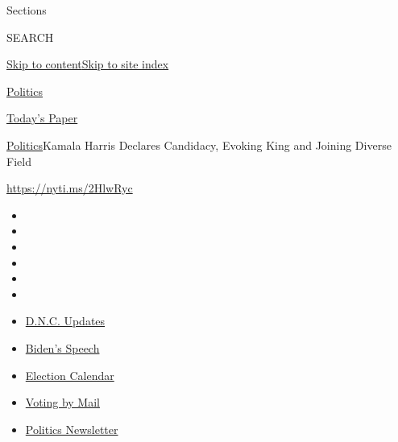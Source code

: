 Sections

SEARCH

\protect\hyperlink{site-content}{Skip to
content}\protect\hyperlink{site-index}{Skip to site index}

\href{https://www.nytimes3xbfgragh.onion/section/politics}{Politics}

\href{https://myaccount.nytimes3xbfgragh.onion/auth/login?response_type=cookie\&client_id=vi}{}

\href{https://www.nytimes3xbfgragh.onion/section/todayspaper}{Today's
Paper}

\href{/section/politics}{Politics}\textbar{}Kamala Harris Declares
Candidacy, Evoking King and Joining Diverse Field

\url{https://nyti.ms/2HlwRyc}

\begin{itemize}
\item
\item
\item
\item
\item
\item
\end{itemize}

\begin{itemize}
\item
  \href{https://www.nytimes3xbfgragh.onion/live/2020/08/20/us/dnc-convention-election?action=click\&pgtype=Article\&state=default\&region=TOP_BANNER\&context=storylines_menu}{D.N.C.
  Updates}
\item
  \href{https://www.nytimes3xbfgragh.onion/2020/08/20/us/politics/biden-presidential-nomination-dnc.html?action=click\&pgtype=Article\&state=default\&region=TOP_BANNER\&context=storylines_menu}{Biden's
  Speech}
\item
  \href{https://www.nytimes3xbfgragh.onion/interactive/2019/us/elections/2020-presidential-election-calendar.html?action=click\&pgtype=Article\&state=default\&region=TOP_BANNER\&context=storylines_menu}{Election
  Calendar}
\item
  \href{https://www.nytimes3xbfgragh.onion/interactive/2020/08/11/us/politics/vote-by-mail-us-states.html?action=click\&pgtype=Article\&state=default\&region=TOP_BANNER\&context=storylines_menu}{Voting
  by Mail}
\item
  \href{https://www.nytimes3xbfgragh.onion/newsletters/politics?action=click\&pgtype=Article\&state=default\&region=TOP_BANNER\&context=storylines_menu}{Politics
  Newsletter}
\end{itemize}

